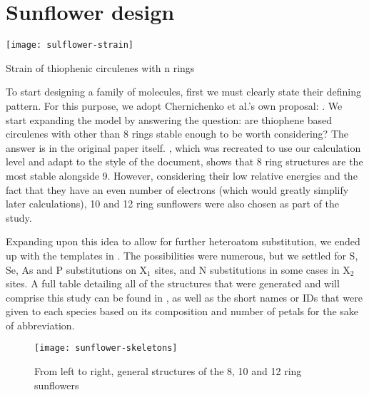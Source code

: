 \section{Sunflower design}

\begin{marginfigure}
    \texttt{[image: sulflower-strain]}
    \caption[Strain of thiophenic circulenes]{Strain of thiophenic circulenes with n rings}
\end{marginfigure}

To start designing a family of molecules, first we must clearly state their defining pattern.
For this purpose, we adopt Chernichenko et al.'s own proposal: .
We start expanding the model by answering the question: are thiophene based circulenes with other than 8 rings stable enough to be worth considering?
The answer is in the original paper itself.
, which was recreated to use our calculation level and adapt to the style of the document, shows that 8 ring structures are the most stable alongside 9.
However, considering their low relative energies and the fact that they have an even number of electrons (which would greatly simplify later calculations), 10 and 12 ring sunflowers were also chosen as part of the study.

Expanding upon this idea to allow for further heteroatom substitution, we ended up with the templates in .
The possibilities were numerous, but we settled for S, Se, As and P substitutions on X$_1$ sites, and N substitutions in some cases in X$_2$ sites. A full table detailing all of the structures that were generated and will comprise this study can be found in , as well as the short names or IDs that were given to each species based on its composition and number of petals for the sake of abbreviation.

\begin{figure*}
    \centering
    \texttt{[image: sunflower-skeletons]}
    \caption[General structures of the sunflower family]{From left to right, general structures of the 8, 10 and 12 ring sunflowers}
\end{figure*}

